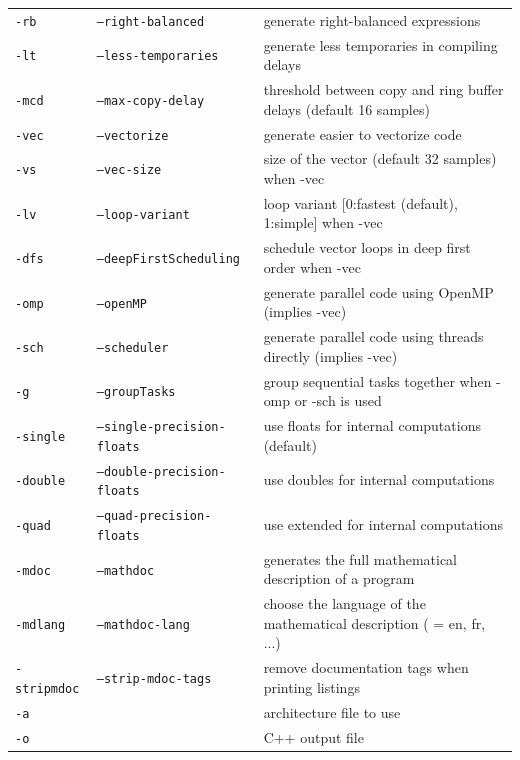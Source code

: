 \documentclass[a4paper,10pt]{book}
\begin{document}
\begin{supertabular}{|p{1.5cm}|p{4cm}|p{5cm}|}
\texttt{-rb} 				& \texttt{--right-balanced}			& generate right-balanced expressions  \\
\texttt{-lt} 				& \texttt{--less-temporaries}		& generate less temporaries in compiling delays  \\
\texttt{-mcd }		& \texttt{--max-copy-delay }& threshold between copy and ring buffer delays (default 16 samples)\\
\hline
\texttt{-vec} 				& \texttt{--vectorize}				& generate easier to vectorize code  \\
\texttt{-vs }		& \texttt{--vec-size }		& size of the vector (default 32 samples) when -vec \\
\texttt{-lv }		& \texttt{--loop-variant }	& loop variant [0:fastest (default), 1:simple] when -vec\\
\texttt{-dfs} 				& \texttt{--deepFirstScheduling}	& schedule vector loops in deep first order when -vec \\
\hline
\texttt{-omp} 				& \texttt{--openMP}					& generate parallel code using OpenMP (implies -vec)  \\
\texttt{-sch} 				& \texttt{--scheduler}				& generate parallel code using threads directly (implies -vec)  \\
\texttt{-g} 				& \texttt{--groupTasks}				& group sequential tasks together when -omp or -sch is used \\
\hline
\texttt{-single} 			& \texttt{--single-precision-floats} & use floats for internal computations (default)  \\
\texttt{-double} 			& \texttt{--double-precision-floats} & use doubles for internal computations  \\
\texttt{-quad} 				& \texttt{--quad-precision-floats}	&  use extended for internal computations  \\
\hline
\texttt{-mdoc} 				& \texttt{--mathdoc}				& generates the full mathematical description of a \faust program \\
\texttt{-mdlang }			& \texttt{--mathdoc-lang } 		& choose the language of the mathematical description ( = en, fr, ...) \\
\texttt{-stripmdoc} 			& \texttt{--strip-mdoc-tags}		& remove documentation tags when printing \faust listings\\
\hline
\texttt{-a } 	&  									& architecture file to use  \\
\texttt{-o } 	&  									& C++ output file\\
\end{supertabular} 
\normalsize
\end{document}
